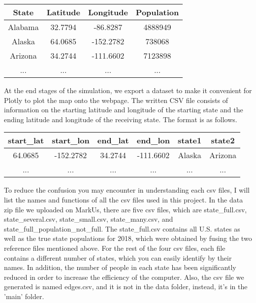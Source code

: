 \documentclass[12pt]{article}
\begin{document}
\begin{center}
\begin{tabular}{|c c c c|}
 \hline
 State & Latitude & Longitude & Population \\ [0.5ex]
 \hline\hline
 Alabama & 32.7794 & -86.8287 & 4888949 \\
 \hline
 Alaska & 64.0685 & -152.2782 & 738068 \\
 \hline
 Arizona & 34.2744 & -111.6602 & 7123898 \\
 \hline
 ... & ... & ... & ... \\
\end{tabular}
\end{center}
At the end stages of the simulation, we export a dataset to make it convenient for Plotly to plot the map onto the webpage. The written CSV file consists of information on the starting latitude and longitude of the starting state and the ending latitude and longitude of the receiving state. The format is as follows.

\begin{center}
\begin{tabular}{|c c c c c c|}
 \hline
 start\_lat & start\_lon & end\_lat & end\_lon & state1 & state2 \\ [0.5ex]
 \hline\hline
 64.0685 & -152.2782& 34.2744& -111.6602 & Alaska & Arizona\\
 \hline
 ... & ... & ... & ... & ... & ... \\
\end{tabular}
\end{center}
To reduce the confusion you may encounter in understanding each csv files, I will list the names and functions of all the csv files used in this project. In the data zip file we uploaded on MarkUs, there are five csv files, which are state\_full.csv, state\_several.csv, state\_small.csv, state\_many.csv, and state\_full\_population\_not\_full. The state\_full.csv contains all U.S. states as well as the true state populations for 2018, which were obtained by fusing the two reference files mentioned above. For the rest of the four csv files, each file contains a different number of states, which you can easily identify by their names. In addition, the number of people in each state has been significantly reduced in order to increase the efficiency of the computer. Also, the csv file we generated is named edges.csv, and it is not in the data folder, instead, it's in the 'main' folder.

\newpage
\end{document}

